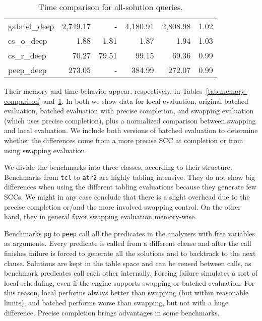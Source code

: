 \documentclass{./tlp}
\newcommand{\redfig}{\vspace{-1em}}
\begin{document}
\begin{table}[t]
\begin{tabular}{|l|r|r|r|r|c|}
     \\\cline{1-6}                                   
    gabriel\_deep & 2,749.17 &    -    & 4,180.91 & 2,808.98 & 1.02
    \\\cline{1-6}                                    
    cs\_o\_deep   & 1.88  & 1.81  & 1.87  & 1.94 &  1.03
    \\\cline{1-6}                                    
    cs\_r\_deep   & 70.27 & 79.51 & 99.15 & 69.36 & 0.99
    \\\cline{1-6}                                                           
    peep\_deep    & 273.05 &    -    & 384.99 & 272.07 & 0.99
\\\cline{1-6}   \end{tabular} 
  \caption{Time comparison for all-solution queries.} 
\label{tab:time-comparison} 
\redfig
\end{table} 


Their memory and time behavior appear, respectively, in
Tables~\ref{tab:memory-comparison} and~\ref{tab:time-comparison}.  In
both we show data for local evaluation, original batched evaluation,
batched evaluation with precise completion, and swapping evaluation
(which uses precise completion), plus a normalized comparison between
swapping and local evaluation.  We include both versions of batched
evaluation to determine whether the differences come from a more
precise SCC at completion or from using swapping evaluation.

We divide the benchmarks into three classes, according to their
structure. Benchmarks from \lstinline{tcl} to \lstinline{atr2} are
highly tabling intensive. They do not show big differences when using
the different tabling evaluations because they generate few SCCs. We
might in any case conclude that there is a slight
overhead due to the precise completion or/and the more involved
swapping control.
On the other hand, they in general favor swapping evaluation
memory-wise.


Benchmarks \lstinline{pg} to \lstinline{peep} call all the predicates
in the analyzers with free variables as arguments.  Every predicate is
called from a different clause and after the call finishes failure is
forced to generate all the solutions and to backtrack to the next
clause.  Solutions are kept in the table space and can be reused
between calls, as benchmark predicates call each other internally.
Forcing failure simulates a sort of local scheduling, even if the
engine supports swapping or batched evaluation.  For this reason,
local performs always better than swapping (but within reasonable
limits), and batched performs worse than swapping, but not with a huge
difference.  Precise completion brings advantages in some benchmarks.
\end{document}
